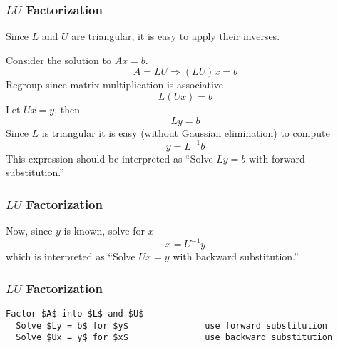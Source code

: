 \documentclass[10pt]{beamer}
\begin{document}
\begin{frame}
\frametitle{$LU$ Factorization}

Since $L$ and $U$ are triangular, it is easy to apply their inverses.

Consider the solution to $Ax=b$.
\begin{equation*}
    A = LU \Longrightarrow (LU)x = b
\end{equation*}
Regroup since matrix multiplication is associative
\begin{equation*}
    L(Ux) = b
\end{equation*}
Let $Ux=y$, then
\begin{equation*}
    Ly = b
\end{equation*}
Since $L$ is triangular it is easy (without Gaussian elimination) to compute
\begin{equation*}
    y = L^{-1}b
\end{equation*}
This expression should be interpreted as ``Solve $Ly=b$ with forward substitution.''

\end{frame}
\begin{frame}
\frametitle{$LU$ Factorization}

Now, since $y$ is known, solve for $x$
\begin{equation*}
    x = U^{-1}y
\end{equation*}
which is interpreted as ``Solve $Ux=y$ with backward substitution.''

\end{frame}
\begin{frame}[fragile]
\frametitle{$LU$ Factorization}
\lstset{language=,}
\begin{lstlisting}[mathescape,caption=LU Solve,label=algo:LUfactSolve]
  Factor $A$ into $L$ and $U$
  Solve $Ly = b$ for $y$               use forward substitution
  Solve $Ux = y$ for $x$               use backward substitution
\end{lstlisting}
\lstset{language=matlab,}
\end{frame}
\end{document}

